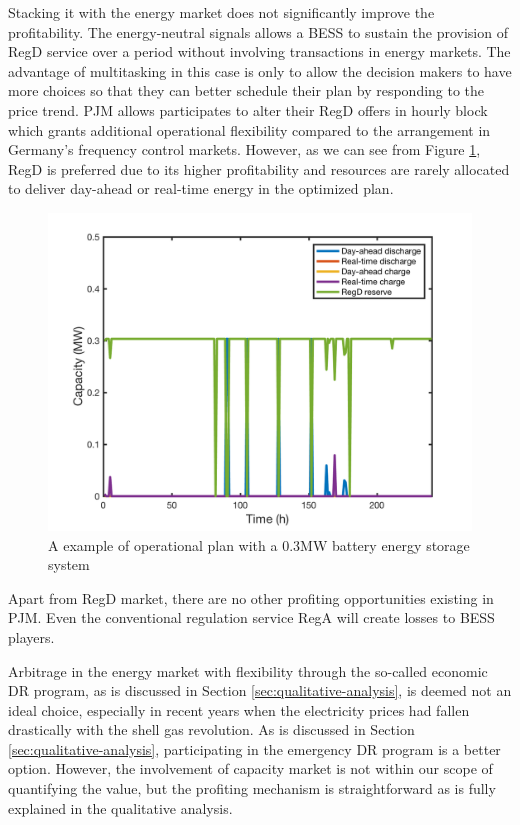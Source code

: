 Stacking it with the energy market does not significantly improve the profitability. The energy-neutral signals allows a BESS to sustain the provision of RegD service over a period without involving transactions in energy markets. The advantage of multitasking in this case is only to allow the decision makers to have more choices so that they can better schedule their plan by responding to the price trend. PJM allows participates to alter their RegD offers in hourly block which grants additional operational flexibility compared to the arrangement in Germany's frequency control markets. However, as we can see from Figure \ref{fig:pjm-multitasking}, RegD is preferred due to its higher profitability and resources are rarely allocated to deliver day-ahead or real-time energy in the optimized plan.

\begin{figure}[h!]
	\centering
	\includegraphics[width=0.9\linewidth]{Figures/PJM_multitasking_example}
	\caption{A example of operational plan with a 0.3MW battery energy storage system}
	\label{fig:pjm-multitasking}
\end{figure}

Apart from RegD market, there are no other profiting opportunities existing in PJM. Even the conventional regulation service RegA will create losses to BESS players.

Arbitrage in the energy market with flexibility through the so-called economic DR program, as is discussed in Section \ref{sec:qualitative-analysis}, is deemed not an ideal choice, especially in recent years when the electricity prices had fallen drastically with the shell gas revolution. As is discussed in Section \ref{sec:qualitative-analysis}, participating in the emergency DR program is a better option. However, the involvement of capacity market is not within our scope of quantifying the value, but the profiting mechanism is straightforward as is fully explained in the qualitative analysis.

